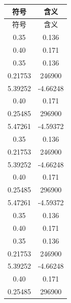 
\begin{longtable}{ C{0.4} C{0.6}}
\toprule[1.5pt]
符号 & 含义 \\  %
\midrule[1pt]
\endfirsthead

\toprule[1.5pt]
符号 & 含义 \\ %
\midrule[1pt]
\endhead

\bottomrule[1.5pt]
\endfoot

0.35 & 0.136 \\  
0.40 & 0.171 \\
0.35 & 0.136 \\
0.21753 & 246900 \\
5.39252 & -4.66248 \\
0.40 & 0.171 \\
0.25485 & 296900 \\
5.47261 & -4.59372 \\
0.35 & 0.136 \\
0.21753 & 246900 \\
5.39252 & -4.66248 \\
0.40 & 0.171 \\ 
0.25485 & 296900 \\
5.47261 & -4.59372 \\
0.35 & 0.136 \\  
0.40 & 0.171 \\
0.35 & 0.136 \\
0.21753 & 246900 \\
5.39252 & -4.66248 \\
0.40 & 0.171 \\
0.25485 & 296900 \\
 
\end{longtable}

